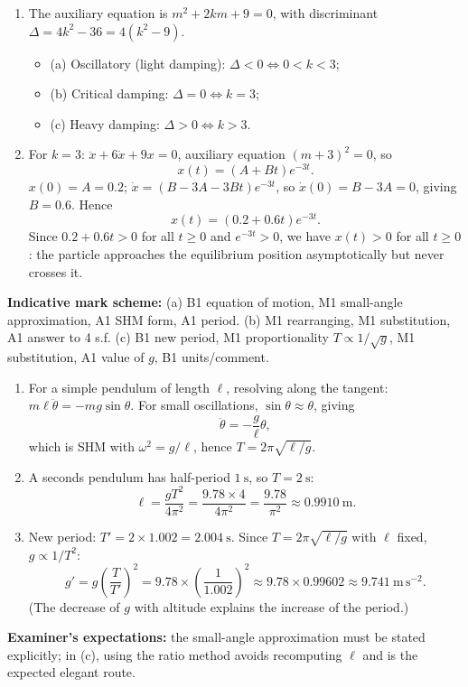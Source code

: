 \documentclass[11pt]{article}
\begin{document}
\begin{corrige}
\begin{enumerate}
\item The auxiliary equation is $m^2 + 2km + 9 = 0$, with discriminant $\Delta = 4k^2 - 36 = 4(k^2 - 9)$.
\begin{itemize}
\item (a) Oscillatory (light damping): $\Delta < 0 \iff 0 < k < 3$;
\item (b) Critical damping: $\Delta = 0 \iff k = 3$;
\item (c) Heavy damping: $\Delta > 0 \iff k > 3$.
\end{itemize}
\item For $k = 3$: $\ddot{x} + 6\dot{x} + 9x = 0$, auxiliary equation $(m+3)^2 = 0$, so
\[
x(t) = (A + Bt)e^{-3t}.
\]
$x(0) = A = 0.2$; $\dot{x} = (B - 3A - 3Bt)e^{-3t}$, so $\dot{x}(0) = B - 3A = 0$, giving $B = 0.6$. Hence
\[
x(t) = (0.2 + 0.6t)e^{-3t}.
\]
Since $0.2 + 0.6t > 0$ for all $t \geq 0$ and $e^{-3t} > 0$, we have $x(t) > 0$ for all $t \geq 0$: the particle approaches the equilibrium position asymptotically but never crosses it.
\end{enumerate}
\end{corrige}

\begin{corrige}
\textbf{Indicative mark scheme:} (a) B1 equation of motion, M1 small-angle approximation, A1 SHM form, A1 period. (b) M1 rearranging, M1 substitution, A1 answer to 4 s.f. (c) B1 new period, M1 proportionality $T \propto 1/\sqrt{g}$, M1 substitution, A1 value of $g$, B1 units/comment.

\begin{enumerate}
\item For a simple pendulum of length $\ell$, resolving along the tangent: $m\ell\ddot{\theta} = -mg\sin\theta$. For small oscillations, $\sin\theta \approx \theta$, giving
\[
\ddot{\theta} = -\frac{g}{\ell}\theta,
\]
which is SHM with $\omega^2 = g/\ell$, hence $T = 2\pi\sqrt{\ell/g}$.
\item A seconds pendulum has half-period $1\ \mathrm{s}$, so $T = 2\ \mathrm{s}$:
\[
\ell = \frac{gT^2}{4\pi^2} = \frac{9.78 \times 4}{4\pi^2} = \frac{9.78}{\pi^2} \approx 0.9910\ \mathrm{m}.
\]
\item New period: $T' = 2 \times 1.002 = 2.004\ \mathrm{s}$. Since $T = 2\pi\sqrt{\ell/g}$ with $\ell$ fixed, $g \propto 1/T^2$:
\[
g' = g\left(\frac{T}{T'}\right)^2 = 9.78 \times \left(\frac{1}{1.002}\right)^2 \approx 9.78 \times 0.99602 \approx 9.741\ \mathrm{m\,s^{-2}}.
\]
(The decrease of $g$ with altitude explains the increase of the period.)
\end{enumerate}
\textbf{Examiner's expectations:} the small-angle approximation must be stated explicitly; in (c), using the ratio method avoids recomputing $\ell$ and is the expected elegant route.
\end{corrige}
\end{document}
